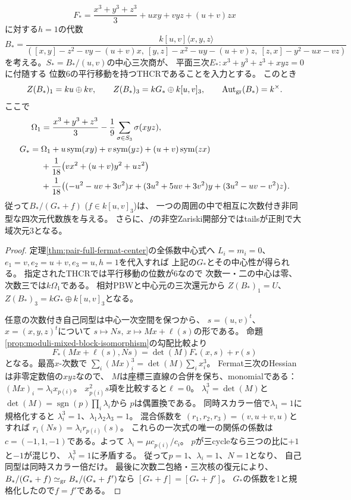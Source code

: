 \begin{proposition}
\label{prop:moduli-rigid-example}
\[
 F_*=\frac{x^3+y^3+z^3}{3}
     +uxy+vyz+(u+v)zx
\]
に対する$h=1$の代数
\[
 B_*=\frac{k[u,v]\langle x,y,z\rangle}
 {([x,y]-z^2-vy-(u+v)x,\
   [y,z]-x^2-uy-(u+v)z,\
   [z,x]-y^2-ux-vz)}
\]
を考える。$S_*=B_* /(u,v)$の中心三次商が、
平面三次$E_*:x^3+y^3+z^3+xyz=0$に付随する
位数6の平行移動を持つTHCRであることを入力とする。
このとき
\[
 Z(B_*)_1=ku\oplus kv,\qquad
 Z(B_*)_3=kG_*\oplus k[u,v]_3,
 \qquad \operatorname{Aut}_{\operatorname{gr}}(B_*)=k^\times.
\]
ここで
\[
\begin{aligned}
 \Omega_1&=\frac{x^3+y^3+z^3}{3}
       -\frac19\sum_{\sigma\in S_3}\sigma(xyz),\\
 G_*={}&\Omega_1+
       u\operatorname{sym}(xy)+v\operatorname{sym}(yz)+(u+v)\operatorname{sym}(zx)\\
 &+\frac1{18}\bigl(vx^2+(u+v)y^2+uz^2\bigr)\\
 &+\frac1{18}\bigl((-u^2-uv+3v^2)x
       +(3u^2+5uv+3v^2)y+(3u^2-uv-v^2)z\bigr).
\end{aligned}
\]
従って$B_*/(G_*+f)$ ($f\in k[u,v]_3$)は、
一つの周囲の中で相互に次数付き非同型な四次元代数族を与える。
さらに、$f$の非空Zariski開部分ではtailsが正則で大域次元3となる。
\end{proposition}
\begin{proof}
定理\ref{thm:pair-full-fermat-center}の全係数中心式へ
$L_i=m_i=0$、$e_1=v,e_2=u+v,e_3=u,h=1$を代入すれば
上記の$G_*$とその中心性が得られる。
指定されたTHCRでは平行移動の位数が6なので
次数一・二の中心は零、次数三では$k\Omega_1$である。
相対PBWと中心元の三次還元から
$Z(B_*)_1=U$、$Z(B_*)_3=kG_*\oplus k[u,v]_3$となる。

任意の次数付き自己同型は中心一次空間を保つから、
$s=(u,v)^t$、$x=(x,y,z)^t$について
$s\mapsto Ns,\ x\mapsto Mx+\ell(s)$の形である。
命題\ref{prop:moduli-mixed-block-isomorphism}の勾配比較より
\[
 F_*(Mx+\ell(s),Ns)=\det(M)F_*(x,s)+r(s)
\]
となる。最高$x$-次数で
$\sum_i(Mx)_i^3=\det(M)\sum_ix_i^3$。
Fermat三次のHessianは非零定数倍の$xyz$なので、
$M$は座標三直線の合併を保ち、monomialである：
$(Mx)_i=\lambda_i x_{p(i)}$。
$x_{p(i)}^2s$項を比較すると$\ell=0$。
$\lambda_i^3=\det(M)$と
$\det(M)=\operatorname{sgn}(p)\prod_i\lambda_i$から
$p$は偶置換である。
同時スカラー倍で$\lambda_1=1$に規格化すると
$\lambda_i^3=1$、$\lambda_1\lambda_2\lambda_3=1$。
混合係数を
$(r_1,r_2,r_3)=(v,u+v,u)$とすれば
$r_i(Ns)=\lambda_i r_{p(i)}(s)$。
これらの一次式の唯一の関係の係数は
$c=(-1,1,-1)$である。よって
$\lambda_i=\mu c_{p(i)}/c_i$。
$p$が三cycleなら三つの比に$+1$と$-1$が混じり、
$\lambda_i^3=1$に矛盾する。
従って$p=1$、$\lambda_i=1$、$N=1$となり、
自己同型は同時スカラー倍だけ。
最後に次数二包絡・三次核の復元により、
$B_*/(G_*+f)\simeq_{\operatorname{gr}}B_*/(G_*+f')$なら
$[G_*+f]=[G_*+f']$。
$G_*$の係数を1と規格化したので$f=f'$である。
\end{proof}

